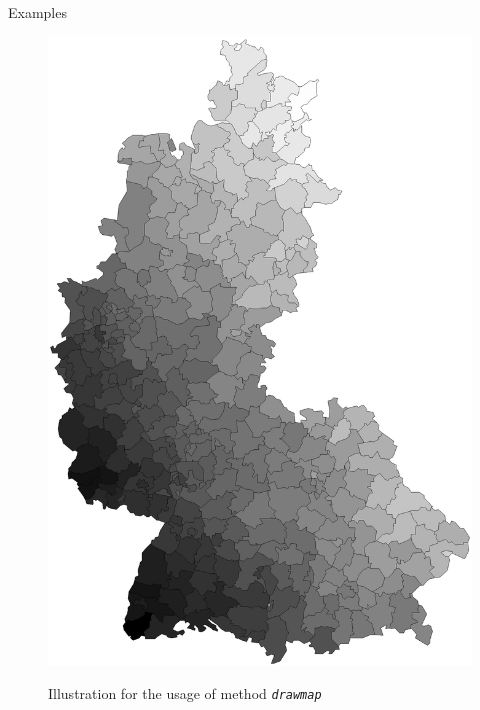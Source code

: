 \begin{stanza}{Examples}
\begin{figure}[ht]
\begin{center}
\includegraphics[scale=0.4]{grafiken/drawmapexample.ps}
{\em\caption{ \label{drawmapexample1} Illustration for the usage
of method \em \texttt{drawmap}}}
\end{center}
\end{figure}



\end{stanza}

